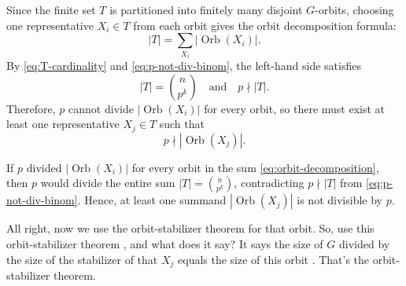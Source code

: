 \begin{proofWrapper}
\begin{content}
\begin{center}
\end{center}

Since the finite set $T$ is partitioned into finitely many disjoint $G$-orbits, choosing one representative $X_i \in T$ from each orbit gives the orbit decomposition formula:
\begin{equation}\label{eq:orbit-decomposition}
|T| = \sum_{X_i} |\operatorname{Orb}(X_i)|.
\end{equation}
By \eqref{eq:T-cardinality} and \eqref{eq:p-not-div-binom}, the left-hand side satisfies
\[
|T| = \binom{n}{p^k} \quad \text{and} \quad p \nmid |T|.
\]
Therefore, $p$ cannot divide $|\operatorname{Orb}(X_i)|$ for every orbit, so there must exist at least one representative $X_j \in T$ such that
\begin{equation}\label{eq:p-not-div-orb}
p \nmid |\operatorname{Orb}(X_j)|.
\end{equation}

\begin{steps}
If $p$ divided $|\operatorname{Orb}(X_i)|$ for every orbit in the sum \eqref{eq:orbit-decomposition}, then $p$ would divide the entire sum $|T| = \binom{n}{p^k}$, contradicting $p \nmid |T|$ from \eqref{eq:p-not-div-binom}. Hence, at least one summand $|\operatorname{Orb}(X_j)|$ is not divisible by $p$.
\end{steps}
\end{content}

\begin{speech}[00:13:59 - 00:15:49]
All right, now we use the orbit-stabilizer theorem for that orbit. So, use this orbit-stabilizer theorem , and what does it say? It says the size of $G$ divided by the size of the stabilizer of that $X_j$ equals the size of this orbit . That's the orbit-stabilizer theorem.


\end{speech}
\end{proofWrapper}

